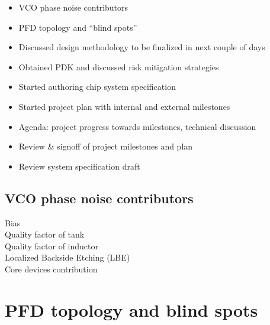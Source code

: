 \documentclass{article}
\begin{document}
\begin{itemize}
	\item VCO phase noise contributors
	\item PFD topology and “blind spots”
	\item Discussed design methodology to be finalized in next couple of days
	\item Obtained PDK and discussed risk mitigation strategies
	\item Started authoring chip system specification
	\item Started project plan with internal and external milestones
	\item Agenda: project progress towards milestones, technical discussion
	\item Review \& signoff of project milestones and plan
	\item Review system specification draft 
\end{itemize}

\subsection{VCO phase noise contributors}

Bias %
\\
Quality factor of tank %
\\
Quality factor of inductor
\\
Localized Backside Etching (LBE)
\\
Core devices contribution 



\section{PFD topology and blind spots}

\end{document}
